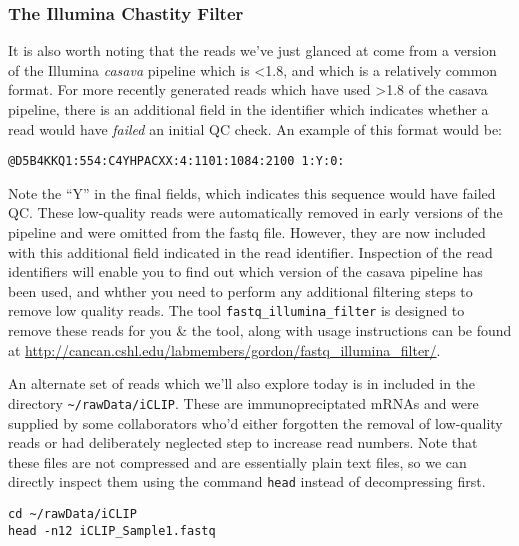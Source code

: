 \subsubsection{The Illumina Chastity Filter}
\begin{information}
It is also worth noting that the reads we've just glanced at come from a version of the Illumina \textit{casava} pipeline which is \textless 1.8, and which is a relatively common format.
For more recently generated reads which have used \textgreater 1.8 of the casava pipeline, there is an additional field in the identifier which indicates whether a read would have \textit{failed} an initial QC check. 
An example of this format would be:
\begin{lstlisting}
@D5B4KKQ1:554:C4YHPACXX:4:1101:1084:2100 1:Y:0:
\end{lstlisting}
Note the ``Y'' in the final fields, which indicates this sequence would have failed QC.
These low-quality reads were automatically removed in early versions of the pipeline and were omitted from the fastq file.
However, they are now included with this additional field indicated in the read identifier.
Inspection of the read identifiers will enable you to find out which version of the casava pipeline has been used, and whther you need to perform any additional filtering steps to remove low quality reads. 
The tool \texttt{fastq_illumina_filter} is designed to remove these reads for you \& the tool, along with usage instructions can be found at \url{http://cancan.cshl.edu/labmembers/gordon/fastq_illumina_filter/}.\\
\end{information}

\begin{steps}
An alternate set of reads which we'll also explore today is in included in the directory \texttt{\~{}/rawData/iCLIP}.
These are immunopreciptated mRNAs and were supplied by some collaborators who'd either forgotten the removal of low-quality reads or had deliberately neglected step to increase read numbers.
Note that these files are not compressed and are essentially plain text files, so we can directly inspect them using the command \texttt{head} instead of decompressing first.\\
\end{steps}

\begin{lstlisting}
cd ~/rawData/iCLIP
head -n12 iCLIP_Sample1.fastq
\end{lstlisting}

